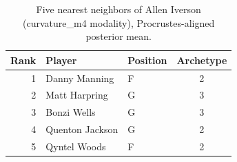 \begin{table}[htbp]
  \centering\small
  \begin{tabular}{rllc}
    \toprule
    Rank & Player & Position & Archetype \\
    \midrule
    1 & Danny Manning & F & 2 \\
    2 & Matt Harpring & G & 3 \\
    3 & Bonzi Wells & G & 3 \\
    4 & Quenton Jackson & G & 2 \\
    5 & Qyntel Woods & F & 2 \\
    \bottomrule
  \end{tabular}
  \caption{Five nearest neighbors of Allen Iverson (curvature_m4 modality), Procrustes-aligned posterior mean.}
  \label{tab:Allen_Iverson_neighbors_curvature_m4}
\end{table}

